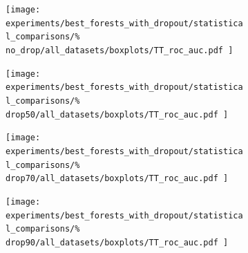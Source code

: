 \begin{figure}[tb]
    \begin{subfigure}{0.24\textwidth}
        \texttt{[image: 
            experiments/best\_forests\_with\_dropout/statistical\_comparisons/\%
            no\_drop/all\_datasets/boxplots/TT\_roc\_auc.pdf
        ]}
    \end{subfigure}
    \begin{subfigure}{0.24\textwidth}
        \texttt{[image: 
            experiments/best\_forests\_with\_dropout/statistical\_comparisons/\%
            drop50/all\_datasets/boxplots/TT\_roc\_auc.pdf
        ]}
    \end{subfigure}
    \begin{subfigure}{0.24\textwidth}
        \texttt{[image: 
            experiments/best\_forests\_with\_dropout/statistical\_comparisons/\%
            drop70/all\_datasets/boxplots/TT\_roc\_auc.pdf
        ]}
    \end{subfigure}
    \begin{subfigure}{0.24\textwidth}
        \texttt{[image: 
            experiments/best\_forests\_with\_dropout/statistical\_comparisons/\%
            drop90/all\_datasets/boxplots/TT\_roc\_auc.pdf
        ]}
    \end{subfigure}


\end{figure}
